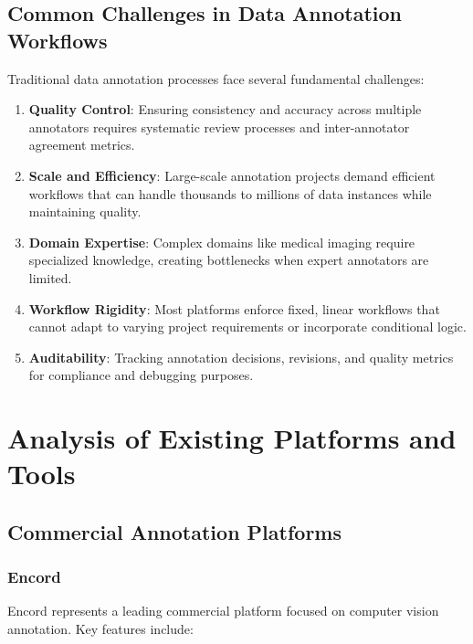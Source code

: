 \subsection{Common Challenges in Data Annotation Workflows}

Traditional data annotation processes face several fundamental challenges:

\begin{enumerate}
    \item \textbf{Quality Control}: Ensuring consistency and accuracy across multiple annotators requires systematic review processes and inter-annotator agreement metrics.
    
    \item \textbf{Scale and Efficiency}: Large-scale annotation projects demand efficient workflows that can handle thousands to millions of data instances while maintaining quality.
    
    \item \textbf{Domain Expertise}: Complex domains like medical imaging require specialized knowledge, creating bottlenecks when expert annotators are limited.
    
    \item \textbf{Workflow Rigidity}: Most platforms enforce fixed, linear workflows that cannot adapt to varying project requirements or incorporate conditional logic.
    
    \item \textbf{Auditability}: Tracking annotation decisions, revisions, and quality metrics for compliance and debugging purposes.
\end{enumerate}

\section{Analysis of Existing Platforms and Tools}
\label{sec:existing-platforms}

\subsection{Commercial Annotation Platforms}

\subsubsection{Encord}

Encord \cite{encord2023} represents a leading commercial platform focused on computer vision annotation. Key features include:

